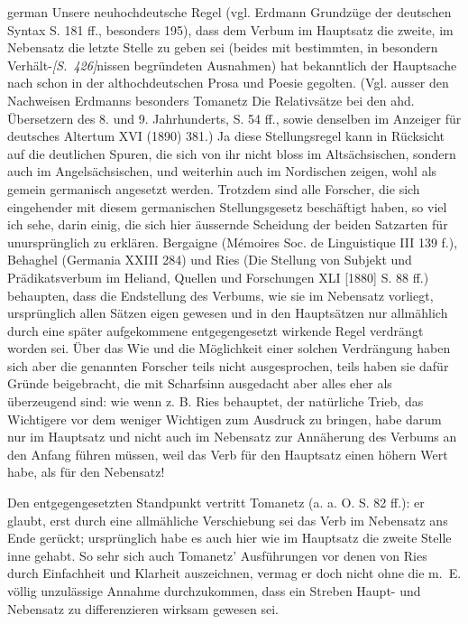 \begin{otherlanguage*}{german}
Unsere neuhochdeutsche Regel (vgl. Erdmann Grundzüge der deutschen Syntax S. 181 ff., besonders 195), dass dem Verbum im Hauptsatz die zweite, im Nebensatz die letzte Stelle zu geben sei (beides mit bestimmten, in besondern Verhält-\hypertarget{p426}{\emph{[S.~426]}}\label{p426}nissen begründeten Ausnahmen) hat bekanntlich der Hauptsache nach schon in der althochdeutschen Prosa und Poesie gegolten. (Vgl. ausser den Nachweisen Erdmanns besonders Tomanetz Die Relativsätze bei den ahd. Übersetzern des 8. und 9. Jahrhunderts, S. 54 ff., sowie denselben im Anzeiger für deutsches Altertum XVI (1890) 381.) Ja diese Stellungsregel kann in Rücksicht auf die deutlichen Spuren, die sich von ihr nicht bloss im Altsächsischen, sondern auch im Angelsächsischen, und weiterhin auch im Nordischen zeigen, wohl als gemein germanisch angesetzt werden. Trotzdem sind alle Forscher, die sich eingehender mit diesem germanischen Stellungsgesetz beschäftigt haben, so viel ich sehe, darin einig, die sich hier äussernde Scheidung der beiden Satzarten für unursprünglich zu erklären. Bergaigne (Mémoires Soc. de Linguistique III 139 f.), Behaghel (Germania XXIII 284) und Ries (Die Stellung von Subjekt und Prädikatsverbum im Heliand, Quellen und Forschungen XLI [1880] S. 88 ff.) behaupten, dass die Endstellung des Verbums, wie sie im Nebensatz vorliegt, ursprünglich allen Sätzen eigen gewesen und in den Hauptsätzen nur allmählich durch eine später aufgekommene entgegengesetzt wirkende Regel verdrängt worden sei. Über das Wie und die Möglichkeit einer solchen Verdrängung haben sich aber die genannten Forscher teils nicht ausgesprochen, teils haben sie dafür Gründe beigebracht, die mit Scharfsinn ausgedacht aber alles eher als überzeugend sind: wie wenn z. B. Ries behauptet, der natürliche Trieb, das Wichtigere vor dem weniger Wichtigen zum Ausdruck zu bringen, habe darum nur im Hauptsatz und nicht auch im Nebensatz zur Annäherung des Verbums an den Anfang führen müssen, weil das Verb für den Hauptsatz einen höhern Wert habe, als für den Nebensatz!

Den entgegengesetzten Standpunkt vertritt Tomanetz (a. a. O. S. 82 ff.): er glaubt, erst durch eine allmähliche Verschiebung sei das Verb im Nebensatz ans Ende gerückt; ursprünglich habe es auch hier wie im Hauptsatz die zweite Stelle inne gehabt. So sehr sich auch Tomanetz’ Ausführungen vor denen von Ries durch Einfachheit und Klarheit auszeichnen, vermag er doch nicht ohne die m.~E. völlig unzulässige Annahme durchzukommen, dass ein Streben Haupt- und Nebensatz zu differenzieren wirksam gewesen sei.


\end{otherlanguage*}
